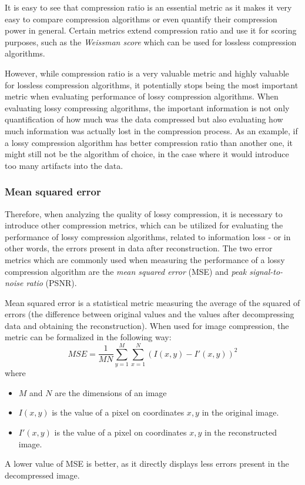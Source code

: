 \documentclass[thesis=M,english]{FITthesis}[2012/10/20]
\begin{document}
It is easy to see that compression ratio is an essential metric as
it makes it very easy to compare compression algorithms or even
quantify their compression power in general. Certain metrics
extend compression ratio and use it for scoring purposes, such as
the \emph{Weissman score} which can be used for lossless compression
algorithms.

However, while compression ratio is a very valuable metric and
highly valuable for lossless compression algorithms, it potentially stops
being the most important metric when evaluating performance of lossy compression algorithms.
When evaluating lossy compressing algorithms, the important information is not
only quantification of how much was the data compressed but also
evaluating how much information was actually lost in the compression
process. As an example, if a lossy compression algorithm has better compression
ratio than another one, it might still not be the algorithm of choice,
in the case where it would introduce too many artifacts into the data.

\subsubsection{Mean squared error}
Therefore, when analyzing the quality of lossy compression,
it is necessary to introduce other compression metrics, which
can be utilized for evaluating the performance of lossy compression
algorithms, related to information loss - or in other words, the errors
present in data after reconstruction. The two error metrics which are
commonly used when measuring the performance of a lossy compression
algorithm are the \emph{mean squared error} (MSE) and \emph{peak
signal-to-noise ratio} (PSNR).\cite{imgcompintro}

Mean squared error is a statistical metric measuring the average
of the squared of errors (the difference between original values and
the values after decompressing data and obtaining the reconstruction).
When used for image compression, the metric can be formalized in the
following way:
\begin{equation}
    MSE = \frac{1}{MN}\sum_{y=1}^{M}\sum_{x=1}^{N}(I(x,y) - I'(x,y))^2
\end{equation}
where
\begin{itemize}
    \item $M$ and $N$ are the dimensions of an image
    \item $I(x, y)$ is the value of a pixel on coordinates $x, y$ in the
    original image.
    \item $I'(x, y)$ is the value of a pixel on coordinates $x, y$ in the
    reconstructed image.
\end{itemize}
A lower value of MSE is better, as it directly displays less errors present
in the decompressed image.
\end{document}
